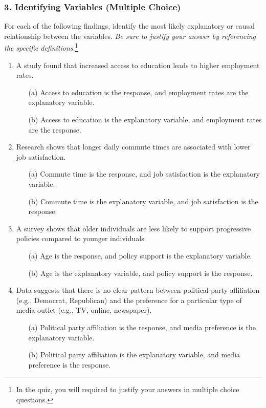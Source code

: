 \documentclass{article}
\begin{document}
\subsubsection*{3. Identifying Variables (Multiple Choice)}
For each of the following findings, identify the most likely explanatory or causal relationship between the variables. \emph{Be sure to justify your answer by referencing the specific definitions}.\footnote{In the quiz, you will required to justify your answers in multiple choice questions.}

\begin{enumerate}
    \item A study found that increased access to education leads to higher employment rates.
    \begin{itemize}
        \item[(a)] Access to education is the response, and employment rates are the explanatory variable.
        \item[(b)] Access to education is the explanatory variable, and employment rates are the response.
    \end{itemize}

    \item Research shows that longer daily commute times are associated with lower job satisfaction.
    \begin{itemize}
        \item[(a)] Commute time is the response, and job satisfaction is the explanatory variable.
        \item[(b)] Commute time is the explanatory variable, and job satisfaction is the response.
    \end{itemize}

    \item A survey shows that older individuals are less likely to support progressive policies compared to younger individuals.
    \begin{itemize}
        \item[(a)] Age is the response, and policy support is the explanatory variable.
        \item[(b)] Age is the explanatory variable, and policy support is the response.
    \end{itemize}

    \item Data suggests that there is no clear pattern between political party affiliation (e.g., Democrat, Republican) and the preference for a particular type of media outlet (e.g., TV, online, newspaper).
    \begin{itemize}
        \item[(a)] Political party affiliation is the response, and media preference is the explanatory variable.
        \item[(b)] Political party affiliation is the explanatory variable, and media preference is the response.
    \end{itemize}


\end{enumerate}
\end{document}
